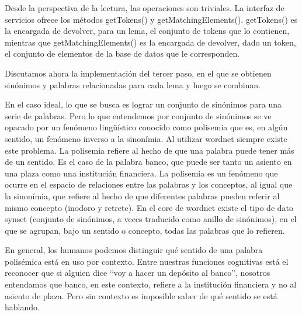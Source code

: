 Desde la perspectiva de la lectura, las operaciones son triviales. La interfaz de servicios ofrece los métodos getTokens() y getMatchingElements(). getTokens() es la encargada de devolver, para un lema, el conjunto de tokens que lo contienen, mientras que getMatchingElements() es la encargada de devolver, dado un token, el conjunto de elementos de la base de datos que le corresponden.

Discutamos ahora la implementación del tercer paso, en el que se obtienen sinónimos y palabras relacionadas para cada lema y luego se combinan.

En el caso ideal, lo que se busca es lograr un conjunto de sinónimos para una serie de palabras. Pero lo que entendemos por conjunto de sinónimos se ve opacado por un fenómeno lingüístico conocido como polisemia que es, en algún sentido, un fenómeno inverso a la sinonímia. Al utilizar wordnet siempre existe este problema. La polisemia refiere al hecho de que una palabra puede tener más de un sentido. Es el caso de la palabra banco, que puede ser tanto un asiento en una plaza como una institución financiera. La polisemia es un fenómeno que ocurre en el espacio de relaciones entre las palabras y los conceptos, al igual que la sinonímia, que refiere al hecho de que diferentes palabras pueden referir al mismo concepto (inodoro y retrete). En el core de wordnet existe el tipo de dato synset (conjunto de sinónimos, a veces traducido como anillo de sinónimos), en el que se agrupan, bajo un sentido o concepto, todas las palabras que lo refieren.

En general, los humanos podemos distinguir qué sentido de una palabra polisémica está en uso por contexto. Entre nuestras funciones cognitivas está el reconocer que si alguien dice ``voy a hacer un depósito al banco'', nosotros entendamos que banco, en este contexto, refiere a la institución financiera y no al asiento de plaza. Pero sin contexto es imposible saber de qué sentido se está hablando.

